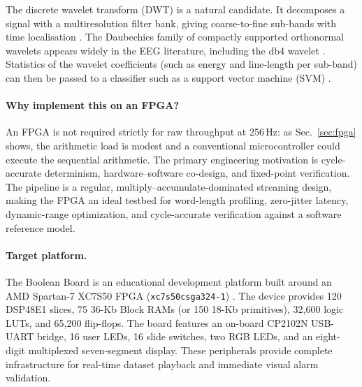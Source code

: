 \documentclass[10pt,twocolumn,letterpaper]{article}
\begin{document}
The discrete wavelet transform (DWT) is a natural candidate. It decomposes a signal with a multiresolution filter bank, giving coarse-to-fine sub-bands with time localisation \cite{mallat1989theory}. The Daubechies family of compactly supported orthonormal wavelets \cite{daubechies1988orthonormal} appears widely in the EEG literature, including the db4 wavelet \cite{shen2022dwt,subasi2007eeg}. Statistics of the wavelet coefficients (such as energy and line-length per sub-band) can then be passed to a classifier such as a support vector machine (SVM) \cite{cortes1995support}.

\paragraph{Why implement this on an FPGA?} An FPGA is not required strictly for raw throughput at 256\,Hz: as Sec.~\ref{sec:fpga} shows, the arithmetic load is modest and a conventional microcontroller could execute the sequential arithmetic. The primary engineering motivation is cycle-accurate determinism, hardware--software co-design, and fixed-point verification. The pipeline is a regular, multiply--accumulate-dominated streaming design, making the FPGA an ideal testbed for word-length profiling, zero-jitter latency, dynamic-range optimization, and cycle-accurate verification against a software reference model.

\paragraph{Target platform.} The Boolean Board is an educational development platform built around an AMD Spartan-7 XC7S50 FPGA (\texttt{xc7s50csga324-1}) \cite{realdigital2024boolean}. The device provides 120 DSP48E1 slices, 75 36-Kb Block RAMs (or 150 18-Kb primitives), 32,600 logic LUTs, and 65,200 flip-flops. The board features an on-board CP2102N USB-UART bridge, 16 user LEDs, 16 slide switches, two RGB LEDs, and an eight-digit multiplexed seven-segment display. These peripherals provide complete infrastructure for real-time dataset playback and immediate visual alarm validation.
\end{document}
